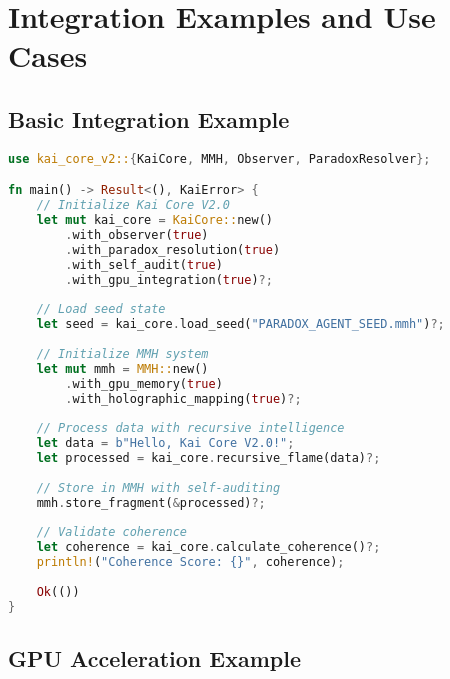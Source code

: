 \documentclass[11pt]{report}
\newcommand{\codebox}[2]{
  \begin{tcolorbox}[
    colback=gray!5,
    colframe=kai_blue,
    title=#1,
    fonttitle=\bfseries
  ]
  #2
  \end{tcolorbox}
}
\begin{document}
\chapter{Integration Examples and Use Cases}

\section{Basic Integration Example}

\codebox{Basic Kai Core V2.0 Integration}{
\begin{lstlisting}[language=rust]
use kai_core_v2::{KaiCore, MMH, Observer, ParadoxResolver};

fn main() -> Result<(), KaiError> {
    // Initialize Kai Core V2.0
    let mut kai_core = KaiCore::new()
        .with_observer(true)
        .with_paradox_resolution(true)
        .with_self_audit(true)
        .with_gpu_integration(true)?;
    
    // Load seed state
    let seed = kai_core.load_seed("PARADOX_AGENT_SEED.mmh")?;
    
    // Initialize MMH system
    let mut mmh = MMH::new()
        .with_gpu_memory(true)
        .with_holographic_mapping(true)?;
    
    // Process data with recursive intelligence
    let data = b"Hello, Kai Core V2.0!";
    let processed = kai_core.recursive_flame(data)?;
    
    // Store in MMH with self-auditing
    mmh.store_fragment(&processed)?;
    
    // Validate coherence
    let coherence = kai_core.calculate_coherence()?;
    println!("Coherence Score: {}", coherence);
    
    Ok(())
}
\end{lstlisting}
}

\section{GPU Acceleration Example}
\end{document}
